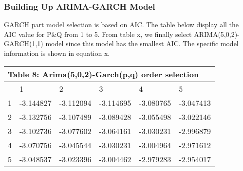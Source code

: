 \subsubsection{Building Up ARIMA-GARCH Model}
GARCH part model selection is based on AIC. The table below display all the AIC value for P&Q from 1 to 5. From table x, we finally select ARIMA(5,0,2)-GARCH(1,1) model since this model has the smallest AIC. The specific model information is shown in equation x. 

\begin{table}[]
\centering
\begin{tabular}{|l|l|l|l|l|l|}
\hline
\multicolumn{6}{|l|}{Table 8: Arima(5,0,2)-Garch(p,q) order selection} \\ \hline
    & 1           & 2           & 3          & 4          & 5          \\ \hline
1   & -3.144827   & -3.112094   & -3.114695  & -3.080765  & -3.047413  \\ \hline
2   & -3.132756   & -3.107489   & -3.089428  & -3.055498  & -3.022146  \\ \hline
3   & -3.102736   & -3.077602   & -3.064161  & -3.030231  & -2.996879  \\ \hline
4   & -3.070756   & -3.045544   & -3.030231  & -3.004964  & -2.971612  \\ \hline
5   & -3.048537   & -3.023396   & -3.004462  & -2.979283  & -2.954017  \\ \hline
\end{tabular}
\end{table}
